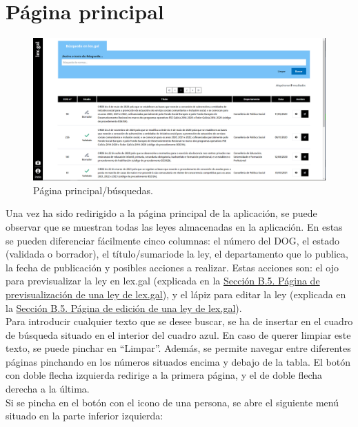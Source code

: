 \section{Página principal}
\label{PPrincipal}

\begin{figure}[H]
\centerline{\includegraphics[width=15cm]{figuras/manualUsuario/Principal.PNG}}
\caption{Página principal/búsquedas.}
\label{enlacePPrincipal}
\end{figure}

Una vez ha sido redirigido a la página principal de la aplicación, se puede observar que se muestran todas las leyes almacenadas en la aplicación. En estas se pueden diferenciar fácilmente cinco columnas: el número del DOG, el estado (validada o borrador), el título/sumariode la ley, el departamento que lo publica, la fecha de publicación y posibles acciones a realizar. Estas acciones son: el ojo para previsualizar la ley en lex.gal (explicada en la \hyperref[PPrevisualizacionLexGal]{Sección B.5. Página de previsualización de una ley de lex.gal}), y el lápiz para editar la ley (explicada en la \hyperref[PEdicionLexGal]{Sección B.5. Página de edición de una ley de lex.gal}). 
\\

Para introducir cualquier texto que se desee buscar, se ha de insertar en el cuadro de búsqueda situado en el interior del cuadro azul. En caso de querer limpiar este texto, se puede pinchar en ``Limpar''. Además, se permite navegar entre diferentes páginas pinchando en los números situados encima y debajo de la tabla. El botón con doble flecha izquierda redirige a la primera página, y el de doble flecha derecha a la última.
\\

Si se pincha en el botón con el icono de una persona, se abre el siguiente menú situado en la parte inferior izquierda:

